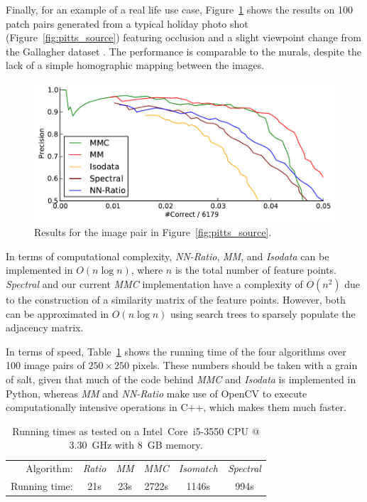 \documentclass[conference]{IEEEtran}
\begin{document}
Finally, for an example of a real life use case, 
Figure~\ref{fig:result_pitts} shows the results on 100 patch pairs 
generated from a typical holiday photo shot 
(Figure~\ref{fig:pitts_source}) featuring occlusion and a slight 
viewpoint change from the Gallagher dataset \cite{gallagher2008}.  The 
performance is comparable to the murals, despite the lack of a simple 
homographic mapping between the images.

\begin{figure}[htb]
\centering
\includegraphics[width=0.9\columnwidth]{images/result_pitts}
\caption{Results for the image pair in Figure~\ref{fig:pitts_source}.}
\label{fig:result_pitts}
\end{figure}

In terms of computational complexity, \emph{NN-Ratio}, \emph{MM}, and 
\emph{Isodata} can be implemented in $O(n\log n)$, where $n$ is the 
total number of feature points.  \emph{Spectral} and our current 
\emph{MMC} implementation have a complexity of $O(n^2)$ due to the 
construction of a similarity matrix of the feature points. However, both
can be approximated in $O(n\log n)$ using search trees to sparsely 
populate the adjacency matrix.  

In terms of speed, Table~\ref{table:running_times} shows the 
running time of the four algorithms over 100 image pairs of $250\!\times\!250$ pixels. 
These numbers should be taken with a grain of salt, given that 
much of the code behind \emph{MMC} and \emph{Isodata} is implemented in 
Python, whereas \emph{MM} and \emph{NN-Ratio} make use of OpenCV to 
execute computationally intensive operations in C++, which makes them 
much faster. 

\begin{table}[htb]
\caption{Running times as tested on a Intel\textregistered\ Core\texttrademark\ i5-3550 CPU @ 
3.30~GHz with 8~GB memory.}
\label{table:running_times}
	\centering
\begin{tabular}{r*{5}{c}}
\hline
	Algorithm: & \emph{Ratio} & \emph{MM} & \emph{MMC} %
& \emph{Isomatch} & \emph{Spectral}	\\
	\noalign{\smallskip} 
	Running time: & 21s & 23s & 2722s & 1146s & 994s\\
	\hline
\end{tabular}
\end{table}
%
\end{document}
